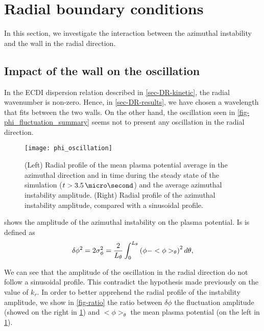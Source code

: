 
\section{Radial boundary conditions}
  \label{sec-DR-BC}
  
  In this section, we investigate the interaction between the azimuthal instability and the wall in the radial direction.
  
  \subsection{Impact of the wall on the oscillation}
  \label{subsec-kr}
  
  In the \ac{ECDI} dispersion relation described in \cref{sec-DR-kinetic}, the radial wavenumber is non-zero.
  Hence, in \cref{sec-DR-results}, we have chosen a wavelength that fits between the two walls.
  On the other hand, the oscillation seen in \cref{fig-phi_fluctuation_summary} seems not to present any oscillation in the radial direction.
  
  
  \begin{figure}[hbtp]
    \centering
    \texttt{[image: phi\_oscillation]}
    \caption{(Left) Radial profile of the mean plasma potential average in the azimuthal direction  and in time during the steady state of the simulation ($t > 3.5 \,\micro\second$) and the average azimuthal instability amplitude. (Right) Radial profile of the  azimuthal instability amplitude, compared with a sinusoidal profile. }
    \label{fig-phi_osci_profile}
  \end{figure}
  
   shows the amplitude of the azimuthal instability on the plasma potential.
  Is is defined as
  \begin{equation} \label{eq-stdphi}
    \delta \phi^2 = 2 \sigma_{\phi}^2 = \frac{{2}}{L_{\theta}} \int_0^{L_{\theta}} \left(  \phi - <\phi>_{\theta}  \right) ^2 d\theta,
  \end{equation}
  
  We can see that the amplitude of the oscillation in the radial direction do not follow a sinusoidal profile.
  This contradict the hypothesis made previously on the value of $k_r$.
  In order to better apprehend the radial profile of the instability amplitude, we show in \cref{fig-ratio} the ratio between $\delta \phi$ the fluctuation amplitude (showed on the right in \cref{fig-phi_osci_profile}) and $<\phi>_{\theta}$  the mean plasma potential (on the left in \cref{fig-phi_osci_profile}).
  
